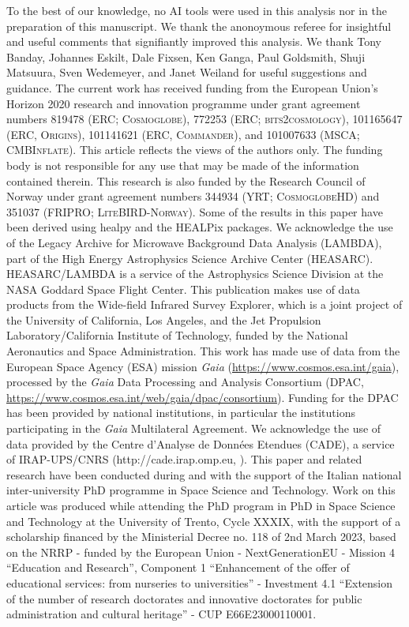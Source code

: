 \documentclass{aa}
\begin{document}
\begin{acknowledgements}
  To the best of our knowledge, no AI tools were used in this analysis nor in the preparation of this manuscript.
  We thank the anonoymous referee for insightful and useful comments that signifiantly improved this analysis.
  We thank Tony Banday, Johannes Eskilt, Dale Fixsen, Ken Ganga, Paul
  Goldsmith, Shuji Matsuura, Sven Wedemeyer, and Janet Weiland for useful suggestions
  and guidance.  
The current work has received funding from the European Union’s Horizon
  2020 research and innovation programme under grant agreement numbers
  819478 (ERC; \textsc{Cosmoglobe}), 772253 (ERC;
  \textsc{bits2cosmology}), 101165647 (ERC, \textsc{Origins}),
  101141621 (ERC, \textsc{Commander}), and 101007633 (MSCA;
  \textsc{CMBInflate}).  This article reflects the views of the
  authors only. The funding body is not responsible for any use that
  may be made of the information contained therein. This research is
  also funded by the Research Council of Norway under grant agreement
  numbers 344934 (YRT; \textsc{CosmoglobeHD}) and 351037 (FRIPRO;
  \textsc{LiteBIRD-Norway}). Some of the results in this paper have been
  derived using healpy \citep{Zonca2019} and the HEALPix
  \citep{healpix} packages.  We acknowledge the use of the Legacy
  Archive for Microwave Background Data Analysis (LAMBDA), part of the
  High Energy Astrophysics Science Archive Center
  (HEASARC). HEASARC/LAMBDA is a service of the Astrophysics Science
  Division at the NASA Goddard Space Flight Center. This publication
  makes use of data products from the Wide-field Infrared Survey
  Explorer, which is a joint project of the University of California,
  Los Angeles, and the Jet Propulsion Laboratory/California Institute
  of Technology, funded by the National Aeronautics and Space
  Administration. This work has made use of data from the European
  Space Agency (ESA) mission {\it Gaia}
  (\url{https://www.cosmos.esa.int/gaia}), processed by the {\it Gaia}
  Data Processing and Analysis Consortium (DPAC,
  \url{https://www.cosmos.esa.int/web/gaia/dpac/consortium}). Funding
  for the DPAC has been provided by national institutions, in
  particular the institutions participating in the {\it Gaia}
  Multilateral Agreement.  We acknowledge the use of data provided by
  the Centre d'Analyse de Données Etendues (CADE), a service of
  IRAP-UPS/CNRS (http://cade.irap.omp.eu, \citealt{paradis:2012}).
  This paper and related research have been conducted during and with
  the support of the Italian national inter-university PhD programme
  in Space Science and Technology. Work on this article was produced
  while attending the PhD program in PhD in Space Science and
  Technology at the University of Trento, Cycle XXXIX, with the
  support of a scholarship financed by the Ministerial Decree no. 118
  of 2nd March 2023, based on the NRRP - funded by the European Union
  - NextGenerationEU - Mission 4 ``Education and Research'', Component 1
  ``Enhancement of the offer of educational services: from nurseries to
  universities'' - Investment 4.1 ``Extension of the number of research
  doctorates and innovative doctorates for public administration and
  cultural heritage'' - CUP E66E23000110001.
\end{acknowledgements}






\end{document}
